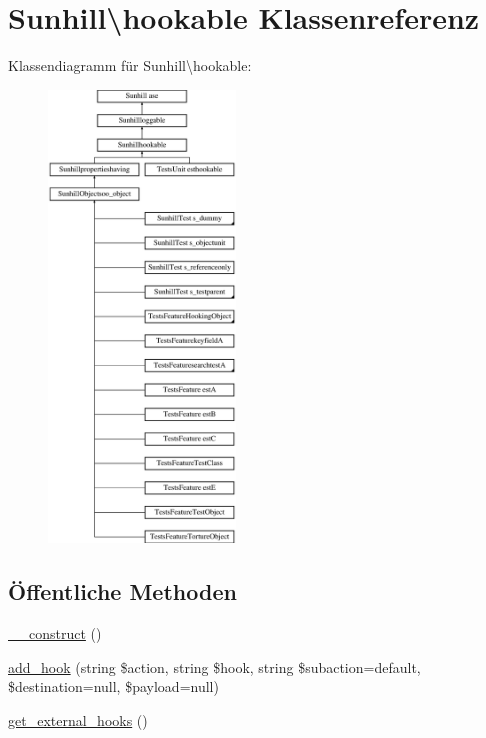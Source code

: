\hypertarget{classSunhill_1_1hookable}{}\section{Sunhill\textbackslash{}hookable Klassenreferenz}
\label{classSunhill_1_1hookable}
Klassendiagramm für Sunhill\textbackslash{}hookable\+:\begin{figure}[H]
\begin{center}
\leavevmode
\includegraphics[height=12.000000cm]{d9/d9c/classSunhill_1_1hookable}
\end{center}
\end{figure}
\subsection*{Öffentliche Methoden}
\begin{DoxyCompactItemize}
\item 
\hyperlink{classSunhill_1_1hookable_ad738a53d0d89572f8ab13c90d6e93884}{\+\_\+\+\_\+construct} ()
\item 
\hyperlink{classSunhill_1_1hookable_a49c99841fd07754621b7fbcadaa326ce}{add\+\_\+hook} (string \$action, string \$hook, string \$subaction=\textquotesingle{}default\textquotesingle{}, \$destination=null, \$payload=null)
\item 
\hyperlink{classSunhill_1_1hookable_aefcadb380a7b8eca22820a82d18d30d3}{get\+\_\+external\+\_\+hooks} ()
\end{DoxyCompactItemize}
